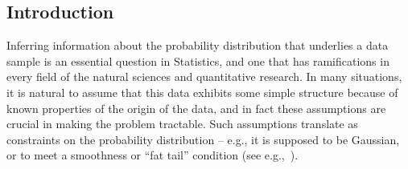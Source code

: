 \renewcommand{\theIRL}{\textsf{Succinctness}}
\newcommand*{\inlineref}[1]{\refstepcounter{IRL}({\theIRL})\label{#1}}

\newcommand{\classmon}{\ensuremath{\mathcal{M}}\xspace}
\newcommand{\classtmo}[1][t]{\ensuremath{\classmon_{#1}}\xspace}
\newcommand{\classuni}{\classtmo[1]}
\newcommand{\classlog}{\ensuremath{\mathcal{L}}\xspace}
\newcommand{\classcvx}{\ensuremath{\mathcal{K}^+}\xspace}
\newcommand{\classcve}{\ensuremath{\mathcal{K}^-}\xspace}
\newcommand{\classmhr}{\ensuremath{\mathcal{MHR}}\xspace}
\newcommand{\classpbd}{\ensuremath{\mathcal{PBD}}\xspace}
\newcommand{\classbin}{\ensuremath{\mathcal{BIN}}\xspace}
\newcommand{\classpoly}[1][t,d]{\ensuremath{\mathcal{P}_{#1}}\xspace}
\newcommand{\classhist}[1][t]{\ensuremath{\mathcal{H}_{#1}}\xspace}
\newcommand{\classksiirv}[1][k]{\ensuremath{#1}\text{-}\ensuremath{\mathcal{SIIRV}}\xspace}

\newcommand{\estimdist}[1][\class]{\textsc{ProjectionDist}_{#1}}

\newcommand{\RightComment}[1]{\Comment{\parbox[t]{.30\linewidth}{\small#1}}} %

\subsection{Introduction}\label{sec:introduction}
Inferring information about the probability distribution that underlies a data sample is an essential question in Statistics, and one that has ramifications in every field of the natural sciences and quantitative research. In many situations, it is natural to assume that this data exhibits some simple structure because of known properties of the origin of the data, and in fact these assumptions are crucial in making the problem tractable. Such assumptions translate as constraints on the probability distribution -- e.g., it is supposed to be Gaussian, or to meet a smoothness or ``fat tail'' condition (see e.g.,~\cite{Mandelbrot:63:FatTail,Hougaard:86:StableDistribs,PhysRevLett:95}).

